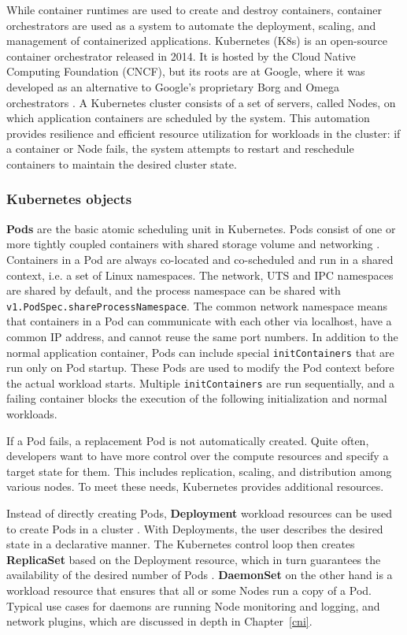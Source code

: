\documentclass[english, 12pt, a4paper, sci, utf8, a-2b, online]{aaltothesis}
\begin{document}
While container runtimes are used to create and destroy containers, container orchestrators are used as a system to automate the deployment, scaling, and management of containerized applications.
Kubernetes (K8s) \cite{kubernetes} is an open-source container orchestrator released in 2014.
It is hosted by the Cloud Native Computing Foundation (CNCF), but its roots are at Google, where it was developed as an alternative to Google's proprietary Borg and Omega orchestrators \cite{burns2016borg}.
A Kubernetes cluster consists of a set of servers, called Nodes, on which application containers are scheduled by the system.
This automation provides resilience and efficient resource utilization for workloads in the cluster: if a container or Node fails, the system attempts to restart and reschedule containers to maintain the desired cluster state.

\subsubsection{Kubernetes objects}

\textbf{Pods} are the basic atomic scheduling unit in Kubernetes.
Pods consist of one or more tightly coupled containers with shared storage volume and networking \cite{k8s-docs-pods}.
Containers in a Pod are always co-located and co-scheduled and run in a shared context, i.e. a set of Linux namespaces.
The network, UTS and IPC namespaces are shared by default, and the process namespace can be shared with \lstinline{v1.PodSpec.shareProcessNamespace}.
The common network namespace means that containers in a Pod can communicate with each other via localhost, have a common IP address, and cannot reuse the same port numbers.
In addition to the normal application container, Pods can include special \lstinline{initContainers} that are run only on Pod startup.
These Pods are used to modify the Pod context before the actual workload starts.
Multiple \lstinline{initContainers} are run sequentially, and a failing container blocks the execution of the following initialization and normal workloads.

If a Pod fails, a replacement Pod is not automatically created.
Quite often, developers want to have more control over the compute resources and specify a target state for them.
This includes replication, scaling, and distribution among various nodes.
To meet these needs, Kubernetes provides additional resources.

Instead of directly creating Pods, \textbf{Deployment} workload resources can be used to create Pods in a cluster \cite{k8s-docs-pods}.
With Deployments, the user describes the desired state in a declarative manner.
The Kubernetes control loop then creates \textbf{ReplicaSet} based on the Deployment resource, which in turn guarantees the availability of the desired number of Pods \cite{k8s-docs-deployment}.
\textbf{DaemonSet} on the other hand is a workload resource that ensures that all or some Nodes run a copy of a Pod.
Typical use cases for daemons are running Node monitoring and logging, and network plugins, which are discussed in depth in Chapter~\ref{cni}.
\end{document}
